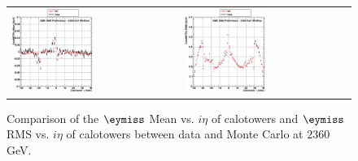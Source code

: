 \begin{figure}[h!]
 \centering
 \begin{tabular}{ll}
  \includegraphics[width=0.5\textwidth]{plots_DataVsMC_MB_2360GeV/g_calometPyMean_vs_ieta_2360.eps} &
  \includegraphics[width=0.5\textwidth]{plots_DataVsMC_MB_2360GeV/g_calometPyRMS_vs_ieta_2360.eps} \\
 \end{tabular}
 \caption{\small Comparison of the $\eymiss$ Mean vs. $i\eta$ of calotowers and $\eymiss$ RMS vs. $i\eta$ of calotowers between 
          data and Monte Carlo at $2360$ GeV.\label{fig:METy_MeanRMS_vs_ieta_2360}}
\end{figure}


\clearpage
